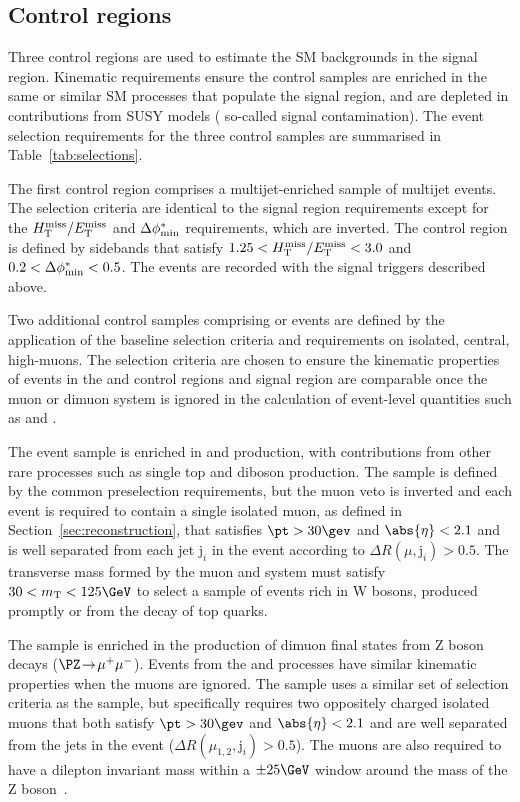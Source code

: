 \subsection{Control regions}
\label{sec:control}

Three control regions are used to estimate the SM backgrounds in the
signal region. Kinematic requirements ensure the control samples are
enriched in the same or similar SM processes that populate the signal
region, and are depleted in contributions from SUSY models (\ie
so-called signal contamination). The event selection requirements for
the three control samples are summarised in
Table~\ref{tab:selections}.

The first control region comprises a multijet-enriched sample of
multijet events. The selection criteria are identical to the signal
region requirements except for the $H_{\mathrm{T}}^{\text{miss}} / E_{\mathrm{T}}^{\text{miss}}$ and $\Delta\phi^{*}_\text{min}$
requirements, which are inverted. The control region is defined by
sidebands that satisfy $1.25 < H_{\mathrm{T}}^{\text{miss}} / E_{\mathrm{T}}^{\text{miss}} < 3.0$ and $0.2 < \Delta\phi^{*}_\text{min} <
0.5$. The events are recorded with the signal triggers described
above.

Two additional control samples comprising \mj or \mmj events are
defined by the application of the baseline selection criteria and
requirements on isolated, central, high-\Pt muons. The selection
criteria are chosen to ensure the kinematic properties of events in
the \mj and \mmj control regions and signal region are comparable once
the muon or dimuon system is ignored in the calculation of event-level
quantities such as \scalht and \mht.

The \mj event sample is enriched in \wmj and \ttbar production, with
contributions from other rare processes such as single top and diboson
production. The sample is defined by the common preselection
requirements, but the muon veto is inverted and each event is required
to contain a single isolated muon, as defined in
Section~\ref{sec:reconstruction}, that satisfies $\pt > 30\gev$ and
$\abs{\eta} < 2.1$ and is well separated from each jet $\mathrm{j}_i$
in the event according to $\Delta R(\mu,\mathrm{j}_i) > 0.5$. The
transverse mass formed by the muon \pt and \ptvecmiss system must
satisfy $30 < m_\mathrm{T} < 125\GeV$ to select a sample of events
rich in W bosons, produced promptly or from the decay of top quarks.

The \mmj sample is enriched in the production of dimuon final states
from Z boson decays ($\PZ\! \rightarrow\!  \mu^+\mu^-$). Events from
the \znunuj and \zmumuj processes have similar kinematic properties
when the muons are ignored. The sample uses a similar set of selection
criteria as the \mj sample, but specifically requires two oppositely
charged isolated muons that both satisfy $\pt > 30\gev$ and
$\abs{\eta} < 2.1$ and are well separated from the jets in the event
($\Delta R(\mu_{1,2},\mathrm{j}_i) > 0.5$). The muons are also
required to have a dilepton invariant mass within a $\pm 25\GeV$
window around the mass of the Z boson~\cite{1674-1137-38-9-090001}.

